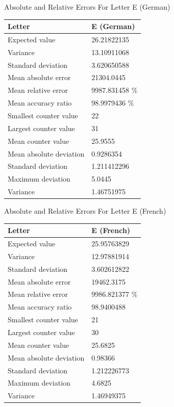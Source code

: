 \documentclass[]{revdetua}
\begin{document}
\begin{table}[!ht]
    \centering
    Absolute and Relative Errors For Letter E (German)
    \begin{tabular}{|l|l|}
    \hline
        Letter & E (German) \\ \hline
        Expected value & 26.21822135 \\ \hline
        Variance & 13.10911068 \\ \hline
        Standard deviation & 3.620650588 \\ \hline
        Mean absolute error & 21304.0445 \\ \hline
        Mean relative error & 9987.831458 \% \\ \hline
        Mean accuracy ratio & 98.9979436 \% \\ \hline
        Smallest counter value & 22 \\ \hline
        Largest counter value & 31 \\ \hline
        Mean counter value & 25.9555 \\ \hline
        Mean absolute deviation & 0.9286354 \\ \hline
        Standard deviation & 1.211412296 \\ \hline
        Maximum deviation & 5.0445 \\ \hline
        Variance & 1.46751975 \\ \hline
    \end{tabular}
\end{table}

\begin{table}[!ht]
    \centering
    Absolute and Relative Errors For Letter E (French)
    \begin{tabular}{|l|l|}
    \hline
        Letter & E (French) \\ \hline
        Expected value & 25.95763829 \\ \hline
        Variance & 12.97881914 \\ \hline
        Standard deviation & 3.602612822 \\ \hline
        Mean absolute error & 19462.3175 \\ \hline
        Mean relative error & 9986.821377 \% \\ \hline
        Mean accuracy ratio & 98.9400488 \\ \hline
        Smallest counter value & 21 \\ \hline
        Largest counter value & 30 \\ \hline
        Mean counter value & 25.6825 \\ \hline
        Mean absolute deviation & 0.98366 \\ \hline
        Standard deviation & 1.212226773 \\ \hline
        Maximum deviation & 4.6825 \\ \hline
        Variance & 1.46949375 \\ \hline
    \end{tabular}
\end{table}
\end{document}
